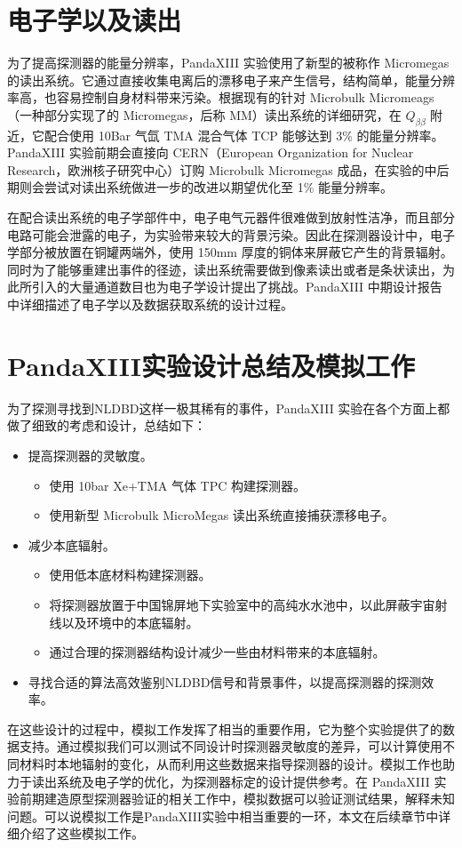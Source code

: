 \section{电子学以及读出}

为了提高探测器的能量分辨率，PandaXIII 实验使用了新型的被称作 Micromegas 的读出系统。它通过直接收集电离后的漂移电子来产生信号，结构简单，能量分辨率高，也容易控制自身材料带来污染。根据现有的针对 Microbulk Micromeags（一种部分实现了的 Micromegas，后称 MM）读出系统的详细研究，在 $Q_{\beta\beta}$ 附近，它配合使用 10Bar 气氙 TMA 混合气体 TCP 能够达到 3\% 的能量分辨率。PandaXIII 实验前期会直接向 CERN（European Organization for Nuclear Research，欧洲核子研究中心）订购 Microbulk Micromegas 成品，在实验的中后期则会尝试对读出系统做进一步的改进以期望优化至 1\% 能量分辨率。

在配合读出系统的电子学部件中，电子电气元器件很难做到放射性洁净，而且部分电路可能会泄露的电子，为实验带来较大的背景污染。因此在探测器设计中，电子学部分被放置在铜罐两端外，使用 150mm 厚度的铜体来屏蔽它产生的背景辐射。同时为了能够重建出事件的径迹，读出系统需要做到像素读出或者是条状读出，为此所引入的大量通道数目也为电子学设计提出了挑战。PandaXIII 中期设计报告\supercite{cdr} 中详细描述了电子学以及数据获取系统的设计过程。

\section{PandaXIII实验设计总结及模拟工作}

为了探测寻找到NLDBD这样一极其稀有的事件，PandaXIII 实验在各个方面上都做了细致的考虑和设计，总结如下：

\vspace{0.4cm}

\begin{itemize}
    \item 提高探测器的灵敏度。
    \begin{itemize}
        \item 使用 10bar Xe+TMA 气体 TPC 构建探测器。
        \item 使用新型 Microbulk MicroMegas 读出系统直接捕获漂移电子。
    \end{itemize}
    \item 减少本底辐射。
    \begin{itemize}
        \item 使用低本底材料构建探测器。
        \item 将探测器放置于中国锦屏地下实验室中的高纯水水池中，以此屏蔽宇宙射线以及环境中的本底辐射。
        \item 通过合理的探测器结构设计减少一些由材料带来的本底辐射。
    \end{itemize}
    \item 寻找合适的算法高效鉴别NLDBD信号和背景事件，以提高探测器的探测效率。
\end{itemize}

\vspace{0.4cm}

在这些设计的过程中，模拟工作发挥了相当的重要作用，它为整个实验提供了的数据支持。通过模拟我们可以测试不同设计时探测器灵敏度的差异，可以计算使用不同材料时本地辐射的变化，从而利用这些数据来指导探测器的设计。模拟工作也助力于读出系统及电子学的优化，为探测器标定的设计提供参考。在 PandaXIII 实验前期建造原型探测器验证的相关工作中，模拟数据可以验证测试结果，解释未知问题。可以说模拟工作是PandaXIII实验中相当重要的一环，本文在后续章节中详细介绍了这些模拟工作。

